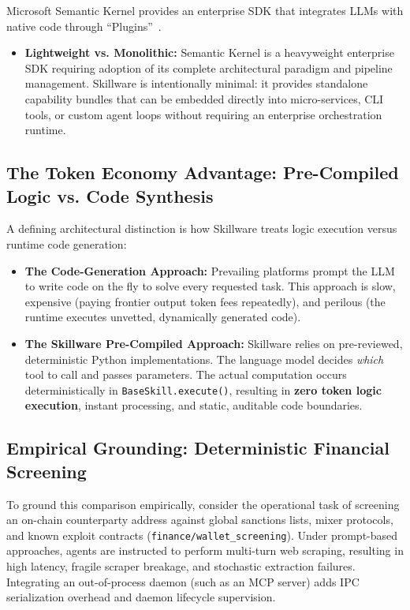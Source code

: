 Microsoft Semantic Kernel provides an enterprise SDK that integrates LLMs with native code through ``Plugins''~\cite{microsoft2023semantickernel}.
\begin{itemize}[leftmargin=*]
  \item \textbf{Lightweight vs. Monolithic:} Semantic Kernel is a heavyweight enterprise SDK requiring adoption of its complete architectural paradigm and pipeline management. Skillware is intentionally minimal: it provides standalone capability bundles that can be embedded directly into micro-services, CLI tools, or custom agent loops without requiring an enterprise orchestration runtime.
\end{itemize}

\subsection{The Token Economy Advantage: Pre-Compiled Logic vs. Code Synthesis}
\label{subsec:token_economy_advantage}

A defining architectural distinction is how Skillware treats logic execution versus runtime code generation:
\begin{itemize}[leftmargin=*]
  \item \textbf{The Code-Generation Approach:} Prevailing platforms prompt the LLM to write code on the fly to solve every requested task. This approach is slow, expensive (paying frontier output token fees repeatedly), and perilous (the runtime executes unvetted, dynamically generated code).
  \item \textbf{The Skillware Pre-Compiled Approach:} Skillware relies on pre-reviewed, deterministic Python implementations. The language model decides \emph{which} tool to call and passes parameters. The actual computation occurs deterministically in \texttt{BaseSkill.execute()}, resulting in \textbf{zero token logic execution}, instant processing, and static, auditable code boundaries.
\end{itemize}

\subsection{Empirical Grounding: Deterministic Financial Screening}
\label{subsec:wallet_case_study}

To ground this comparison empirically, consider the operational task of screening an on-chain counterparty address against global sanctions lists, mixer protocols, and known exploit contracts (\texttt{finance/wallet\_screening}). Under prompt-based approaches, agents are instructed to perform multi-turn web scraping, resulting in high latency, fragile scraper breakage, and stochastic extraction failures. Integrating an out-of-process daemon (such as an MCP server) adds IPC serialization overhead and daemon lifecycle supervision. 


